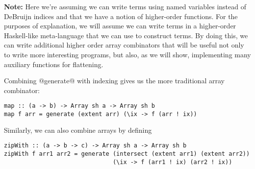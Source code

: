 \begin{aside}
\textbf{Note:} Here we're assuming we can write terms using named variables instead of DeBruijn indices and that we have a notion of higher-order functions. For the purposes of explanation, we will assume we can write terms in a higher-order Haskell-like meta-language that we can use to construct \ndp{} terms. By doing this, we can write additional higher order array combinators that will be useful not only to write more interesting programs, but also, as we will show, implementing many auxiliary functions for flattening.
\end{aside}

Combining @generate@ with indexing gives us the more traditional array combinator:
%
\begin{lstlisting}
map :: (a -> b) -> Array sh a -> Array sh b
map f arr = generate (extent arr) (\ix -> f (arr ! ix))
\end{lstlisting}
%
Similarly, we can also combine arrays by defining
%
\begin{lstlisting}
zipWith :: (a -> b -> c) -> Array sh a -> Array sh b
zipWith f arr1 arr2 = generate (intersect (extent arr1) (extent arr2))
                               (\ix -> f (arr1 ! ix) (arr2 ! ix))
\end{lstlisting}


